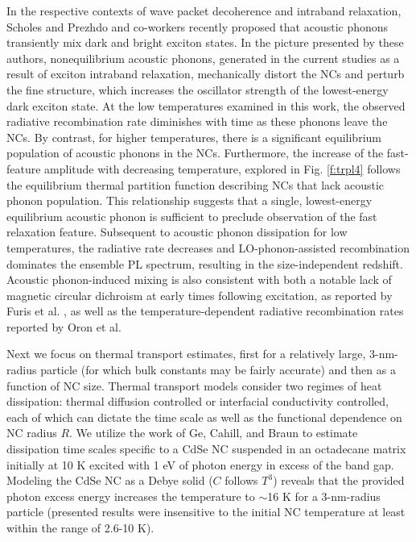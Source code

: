 In the respective contexts of wave packet decoherence and intraband relaxation, Scholes \cite{doi:10.1021/nl061414e, doi:10.1021/nl803275a, :/content/aip/journal/jcp/132/10/10.1063/1.3350871} and Prezhdo and co-workers \cite{doi:10.1021/jp0669052} recently proposed that acoustic phonons transiently mix dark and bright exciton states. In the picture presented by these authors, nonequilibrium acoustic phonons, generated in the current studies as a result of exciton intraband relaxation, mechanically distort the NCs and perturb the fine structure, which increases the oscillator strength of the lowest-energy dark exciton state. At the low temperatures examined in this work, the observed radiative recombination rate diminishes with time as these phonons leave the NCs. By contrast, for higher temperatures, there is a significant equilibrium population of acoustic phonons in the NCs. Furthermore, the increase of the fast-feature amplitude with decreasing temperature, explored in Fig. \ref{f:trpl4} follows the equilibrium thermal partition function describing NCs that lack acoustic phonon population. This relationship suggests that a single, lowest-energy equilibrium acoustic phonon is sufficient to preclude observation of the fast relaxation feature. Subsequent to acoustic phonon dissipation for low temperatures, the radiative rate decreases and LO-phonon-assisted recombination dominates the ensemble PL spectrum, resulting in the size-independent redshift. Acoustic phonon-induced mixing is also consistent with both a notable lack of magnetic circular dichroism at early times following excitation, as reported by Furis et al. \cite{doi:10.1021/jp051738b},  as well as the temperature-dependent radiative recombination rates reported by Oron et al. \cite{PhysRevLett.102.177402} \par

Next we focus on thermal transport estimates, first for a relatively large, 3-nm-radius particle (for which bulk constants may be fairly accurate) and then as a function of NC size. Thermal transport models consider two regimes of heat dissipation: thermal diffusion controlled or interfacial conductivity controlled, each of which can dictate the time scale as well as the functional dependence on NC radius $R$.  We utilize the work of Ge, Cahill, and Braun \cite{PhysRevB.66.224301} to estimate dissipation time scales specific to a CdSe NC suspended in an octadecane matrix initially at 10 K excited with 1 eV of photon energy in excess of the band gap. Modeling the CdSe NC as a Debye solid ($C$ follows $T^3$) reveals that the provided photon excess energy increases the temperature to $\sim$16 K for a 3-nm-radius particle (presented results were insensitive to the initial NC temperature at least within the range of 2.6-10 K).  \par

